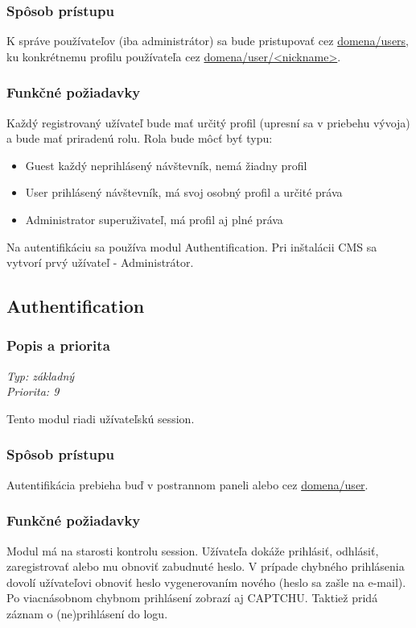 \documentclass[a4paper,titlepage,11pt]{article}
\begin{document}
\subsubsection{Spôsob prístupu}
K správe používateľov (iba administrátor) sa bude pristupovať cez \url{domena/users}, ku konkrétnemu profilu používateľa cez \url{domena/user/<nickname>}.
\subsubsection{Funkčné požiadavky}
Každý registrovaný užívateľ bude mať určitý profil (upresní sa v priebehu vývoja) a bude mať priradenú rolu. 
Rola bude môcť byť typu:
\begin{itemize}
 \item Guest
  \subitem každý neprihlásený návštevník, nemá žiadny profil
 \item User
  \subitem prihlásený návštevník, má svoj osobný profil a určité práva
 \item Administrator
  \subitem superuživateľ, má profil aj plné práva
\end{itemize}
Na autentifikáciu sa používa modul Authentification. Pri inštalácii CMS sa vytvorí prvý užívateľ - Administrátor.

\subsection{Authentification}
\subsubsection{Popis a priorita}
\begin{flushleft}
 \emph{Typ: základný}\\
 \emph{Priorita: 9}\\
\end{flushleft}
Tento modul riadi užívateľskú session. 
\subsubsection{Spôsob prístupu}
Autentifikácia prebieha buď v postrannom paneli alebo cez \url{domena/user}.
\subsubsection{Funkčné požiadavky}
Modul má na starosti kontrolu session. Užívateľa dokáže prihlásiť, odhlásiť, zaregistrovať alebo mu obnoviť zabudnuté heslo.
V prípade chybného prihlásenia dovolí užívateľovi obnoviť heslo vygenerovaním nového (heslo sa zašle na e-mail).
Po viacnásobnom chybnom prihlásení zobrazí aj CAPTCHU. Taktiež pridá záznam o (ne)prihlásení do logu.
  
\end{document}
